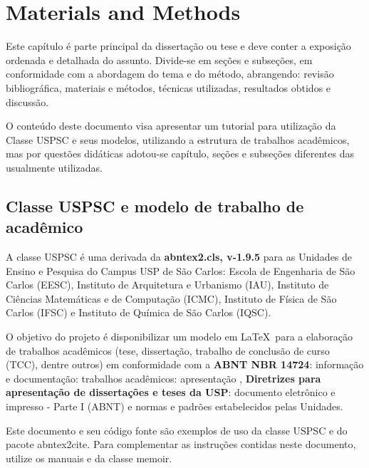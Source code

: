 

\chapter{Materials and Methods}\label{ch:mat}
Este capítulo é parte principal da dissertação ou tese e deve conter a exposição ordenada e detalhada do assunto. Divide-se em seções e subseções, em conformidade com a abordagem do tema e do método, abrangendo: revisão bibliográfica, materiais e métodos, técnicas utilizadas, resultados obtidos e discussão.

O conteúdo deste documento visa apresentar um tutorial para utilização da Classe USPSC e seus modelos, utilizando a estrutura de trabalhos acadêmicos, mas por questões didáticas adotou-se capítulo, seções e subseções diferentes das usualmente utilizadas.


\section{Classe USPSC e modelo de trabalho de acadêmico}
A classe USPSC é uma derivada da \textbf{\textsf{abntex2}.cls, v-1.9.5} para as Unidades de Ensino e Pesquisa do Campus USP de São Carlos:
Escola de Engenharia de São Carlos (EESC), Instituto de Arquitetura e Urbanismo (IAU), Instituto de Ciências Matemáticas e de Computação (ICMC), Instituto de Física de São Carlos (IFSC) e Instituto de Química de São Carlos (IQSC).

O objetivo do projeto é disponibilizar um modelo em \LaTeX\  para a elaboração de trabalhos acadêmicos (tese, dissertação, trabalho de conclusão de curso (TCC), dentre outros) em conformidade com a \textbf{ABNT NBR 14724}: informação e documentação: trabalhos acadêmicos: apresentação \cite{nbr14724}, \textbf{Diretrizes para apresentação de dissertações e teses da USP}: documento eletrônico e impresso - Parte I (ABNT) \cite{sibi2009} e normas e padrões estabelecidos pelas Unidades.

Este documento e seu código fonte são exemplos de uso da classe USPSC e do pacote \textsf{abntex2cite}.
Para complementar as instruções contidas neste documento, utilize os manuais \cite{abnetxclasse,abnetxcite,abnetxcitealf} e da classe \textsf{memoir}\cite{memoir2010}. 


